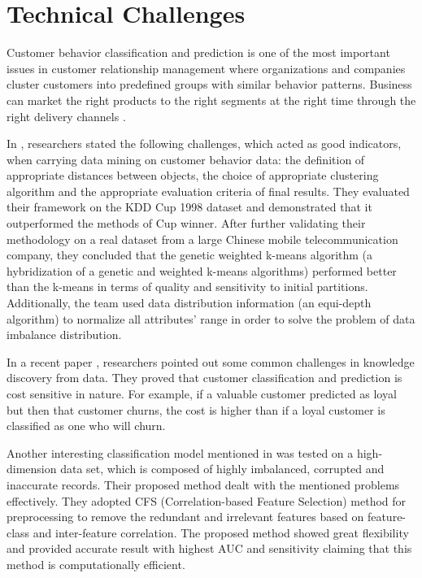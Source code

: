 \documentclass[journal]{IEEEtran}
\begin{document}
\section{Technical Challenges}\label{Sec:Technical Challenges}
Customer behavior classification and prediction is one of the most important issues in customer relationship management where organizations and companies cluster customers into predefined groups with similar behavior patterns. Business can market the right products to the right segments at the right time through the right delivery channels \cite{Ref:CRMBasedonDataMiningTechnique}.
\par
In \cite{Ref:CostSensitiveDataPreprocessing}, researchers stated the following challenges, which acted as good indicators, when carrying data mining on customer behavior data: the definition of appropriate distances between objects, the choice of appropriate clustering algorithm and the appropriate evaluation criteria of final results. They evaluated their framework on the KDD Cup 1998 dataset and demonstrated that it outperformed the methods of Cup winner. After further validating their methodology on a real dataset from a large Chinese mobile telecommunication company, they concluded that the genetic weighted k-means algorithm (a hybridization of a genetic and weighted k-means algorithms) performed better than the k-means in terms of quality and sensitivity to initial partitions. Additionally, the team used data distribution information (an equi-depth algorithm) to normalize all attributes' range in order to solve the problem of data imbalance distribution.
\par
In a recent paper \cite{Ref:ChallengesinKDDataMiningDatasets}, researchers pointed out some common challenges in knowledge discovery from data. They proved that customer classification and prediction is cost sensitive in nature. For example, if a valuable customer predicted as loyal but then that customer churns, the cost is higher than if a loyal customer is classified as one who will churn.
\par
Another interesting classification model mentioned in \cite{Ref:TowardsAnOptimalClassificationModel} was tested on a high-dimension data set, which is composed of highly imbalanced, corrupted and inaccurate records. Their proposed method dealt with the mentioned problems effectively. They adopted CFS (Correlation-based Feature Selection) method for preprocessing to remove the redundant and irrelevant features based on feature-class and inter-feature correlation. The proposed method showed great flexibility and provided accurate result with highest AUC and sensitivity claiming that this method is computationally efficient.
\end{document}
